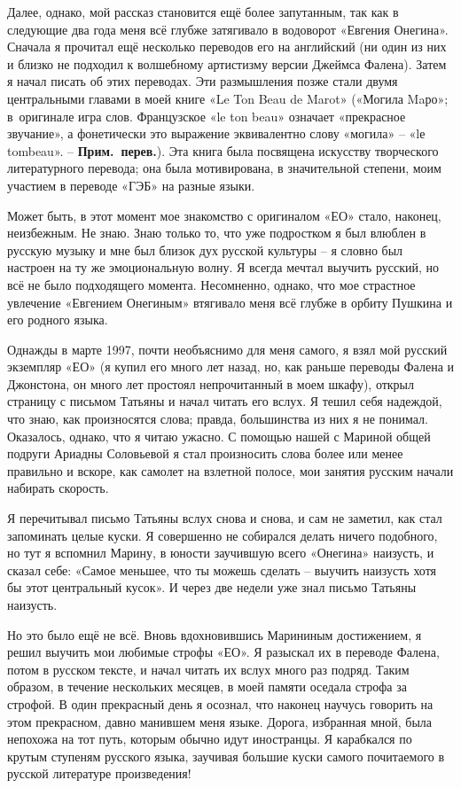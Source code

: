 \documentclass[../main.tex]{subfiles}
\begin{document}
Далее, однако, мой рассказ становится ещё более запутанным, так как в следующие два года меня всё глубже затягивало в водоворот «Евгения Онегина». Сначала я прочитал ещё несколько переводов его на английский (ни один из них и близко не подходил к волшебному артистизму версии Джеймса Фалена). Затем я начал писать об этих переводах. Эти размышления позже стали двумя центральными главами в моей книге «Le Ton Beau de Marot» («Могила Maро»; в~оригинале игра слов. Французское «le ton beau» означает «прекрасное звучание», а фонетически это выражение эквивалентно слову «могила» \--- «lе tombeau». \--- \textbf{Прим.\ перев.}). Эта книга была посвящена искусству творческого литературного перевода; она была мотивирована, в значительной степени, моим участием в переводе «ГЭБ» на разные языки.

Может быть, в этот момент мое знакомство с оригиналом «ЕО» стало, наконец, неизбежным. Не знаю. Знаю только то, что уже подростком я был влюблен в русскую музыку и мне был близок дух русской культуры \--- я словно был настроен на ту же эмоциональную волну. Я всегда мечтал выучить русский, но всё не было подходящего момента. Несомненно, однако, что мое страстное увлечение «Евгением Онегиным» втягивало меня всё глубже в орбиту Пушкина и его родного языка.

Однажды в марте 1997, почти необъяснимо для меня самого, я взял мой русский экземпляр «ЕО» (я купил его много лет назад, но, как раньше переводы Фалена и Джонстона, он много лет простоял непрочитанный в моем шкафу), открыл страницу с письмом Татьяны и начал читать его вслух. Я тешил себя надеждой, что знаю, как произносятся слова; правда, большинства из них я не понимал. Оказалось, однако, что я читаю ужасно. С помощью нашей с Мариной общей подруги Ариадны Соловьевой я стал произносить слова более или менее правильно и вскоре, как самолет на взлетной полосе, мои занятия русским начали набирать скорость.

Я перечитывал письмо Татьяны вслух снова и снова, и сам не заметил, как стал запоминать целые куски. Я совершенно не собирался делать ничего подобного, но тут я вспомнил Марину, в юности заучившую всего «Онегина» наизусть, и сказал себе: «Самое меньшее, что ты можешь сделать \--- выучить наизусть хотя бы этот центральный кусок». И через две недели уже знал письмо Татьяны наизусть.

Но это было ещё не всё. Вновь вдохновившись Марининым достижением, я решил выучить мои любимые строфы «ЕО». Я разыскал их в переводе Фалена, потом в русском тексте, и начал читать их вслух много раз подряд. Таким образом, в течение нескольких месяцев, в моей памяти оседала строфа за строфой. В один прекрасный день я осознал, что наконец научусь говорить на этом прекрасном, давно манившем меня языке. Дорога, избранная мной, была непохожа на тот путь, которым обычно идут иностранцы. Я карабкался по крутым ступеням русского языка, заучивая большие куски самого почитаемого в русской литературе произведения!
\end{document}
